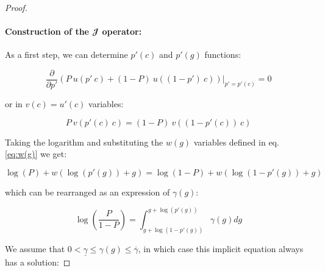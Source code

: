 \documentclass{article}
\theoremstyle{definition}
\begin{document}
\begin{proof}
    {
    \begin{center}
    

    \end{center}
    }

    \paragraph{Construction of the $\mathbfcal{J}$ operator:}

    As a first step, we can determine $p'(c)$ and $p'(g)$ functions:

    \begin{equation}
        \frac{\partial}{\partial p'} \left ( P \ u(p' \ c) + (1-P) \ u((1-p') \ c) \right ) \Bigr|_{p'=p'(c)} = 0
    \end{equation}

    or in $v(c) = u'(c)$ variables:

    \begin{equation}
        \label{eq:ppv}
         P \ v(p'(c) \ c) = (1-P) \ v((1-p'(c)) \ c)
    \end{equation}

    Taking the logarithm and substituting the $w(g)$ variables defined in eq. \eqref{eq:w(g)} we get:

    \begin{equation}
         \log(P) + w(\log(p'(g)) + g) = \log(1-P) + w(\log(1-p'(g))+g)
    \end{equation}

    which can be rearranged as an expression of $\gamma(g)$:

    \begin{equation}
        \log \left ( \frac{P}{1-P} \right ) = \int_{g+\log(1-p'(g))}^{g+\log(p'(g))} \gamma(g) dg
    \end{equation}

    We assume that $0 < \underline{\gamma} \le \gamma(g) \le \overline{\gamma}$, in which case this implicit equation always has a solution:


\end{proof}
\end{document}
